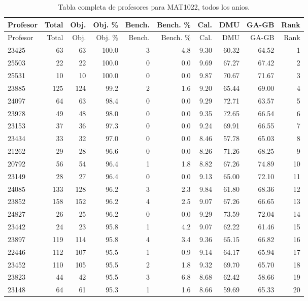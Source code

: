 \begingroup
\scriptsize
\setlength{\tabcolsep}{3pt}
\begin{longtable}{lrrrrrrrrr}
\caption{Tabla completa de profesores para MAT1022, todos los anios.}\label{tab:prof-global-mat1022}\\
\toprule
Profesor & Total & Obj. & Obj. \% & Bench. & Bench. \% & Cal. & DMU & GA-GB & Rank \\
\midrule
\endfirsthead
\toprule
Profesor & Total & Obj. & Obj. \% & Bench. & Bench. \% & Cal. & DMU & GA-GB & Rank \\
\midrule
\endhead
23425 & 63 & 63 & 100.0 & 3 & 4.8 & 9.30 & 60.32 & 64.52 & 1 \\
25503 & 22 & 22 & 100.0 & 0 & 0.0 & 9.69 & 67.27 & 67.42 & 2 \\
25531 & 10 & 10 & 100.0 & 0 & 0.0 & 9.87 & 70.67 & 71.67 & 3 \\
23885 & 125 & 124 & 99.2 & 2 & 1.6 & 9.20 & 65.44 & 69.00 & 4 \\
24097 & 64 & 63 & 98.4 & 0 & 0.0 & 9.29 & 72.71 & 63.57 & 5 \\
23978 & 49 & 48 & 98.0 & 0 & 0.0 & 9.35 & 72.65 & 66.54 & 6 \\
23153 & 37 & 36 & 97.3 & 0 & 0.0 & 9.24 & 69.91 & 66.55 & 7 \\
23434 & 33 & 32 & 97.0 & 0 & 0.0 & 8.46 & 57.78 & 65.03 & 8 \\
21262 & 29 & 28 & 96.6 & 0 & 0.0 & 8.26 & 71.26 & 68.25 & 9 \\
20792 & 56 & 54 & 96.4 & 1 & 1.8 & 8.82 & 67.26 & 74.89 & 10 \\
23149 & 28 & 27 & 96.4 & 0 & 0.0 & 9.13 & 65.00 & 72.10 & 11 \\
24085 & 133 & 128 & 96.2 & 3 & 2.3 & 9.84 & 61.80 & 68.36 & 12 \\
23852 & 158 & 152 & 96.2 & 4 & 2.5 & 9.07 & 67.26 & 66.65 & 13 \\
24827 & 26 & 25 & 96.2 & 0 & 0.0 & 9.29 & 73.59 & 72.04 & 14 \\
23442 & 24 & 23 & 95.8 & 1 & 4.2 & 9.07 & 62.22 & 61.46 & 15 \\
23897 & 119 & 114 & 95.8 & 4 & 3.4 & 9.36 & 65.15 & 66.82 & 16 \\
22446 & 112 & 107 & 95.5 & 1 & 0.9 & 9.14 & 64.17 & 65.94 & 17 \\
23452 & 110 & 105 & 95.5 & 2 & 1.8 & 9.32 & 69.70 & 65.70 & 18 \\
23823 & 44 & 42 & 95.5 & 3 & 6.8 & 8.68 & 62.42 & 58.66 & 19 \\
23148 & 64 & 61 & 95.3 & 1 & 1.6 & 8.66 & 59.69 & 65.33 & 20 \\

\end{longtable}
